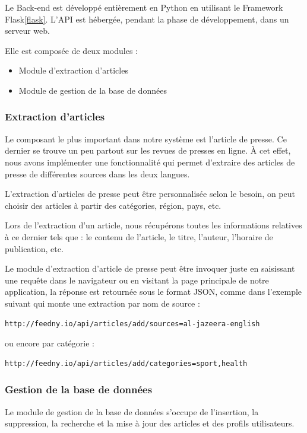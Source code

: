     Le Back-end est développé entièrement en Python en utilisant le Framework Flask\autoref{flask}. L'API est hébergée, pendant la phase de développement, dans un serveur web. 
    
    Elle est composée de deux modules :
        \begin{itemize}
            \item Module d'extraction d'articles
            \item Module de gestion de la base de données
        \end{itemize} 

        \subsubsection{Extraction d'articles}
        Le composant le plus important dans notre système est l'article de presse. Ce dernier se trouve un peu partout sur les revues de presses en ligne. À cet effet, nous avons implémenter une fonctionnalité qui permet d'extraire des articles de presse de différentes sources dans les deux langues.

        L'extraction d'articles de presse peut être personnalisée selon le besoin, on peut choisir des articles à partir des catégories, région, pays, etc.

        Lors de l'extraction d'un article, nous récupérons toutes les informations relatives à ce dernier tels que : le contenu de l'article, le titre, l'auteur, l'horaire de publication, etc.

        Le module d'extraction d'article de presse peut être invoquer juste en saisissant une requête dans le navigateur ou en visitant la page principale de notre application, la réponse est retournée sous le format JSON, comme dans l'exemple suivant qui monte une extraction par nom de source :

\begin{lstlisting}[style=api] 
  http://feedny.io/api/articles/add/sources=al-jazeera-english
\end{lstlisting}
        
        ou encore par catégorie :
\begin{lstlisting}[style=api] 
  http://feedny.io/api/articles/add/categories=sport,health
\end{lstlisting}  

        \subsubsection{Gestion de la base de données}
        Le module de gestion de la base de données s'occupe de l'insertion, la suppression, la recherche et la mise à jour des articles et des profils utilisateurs.

